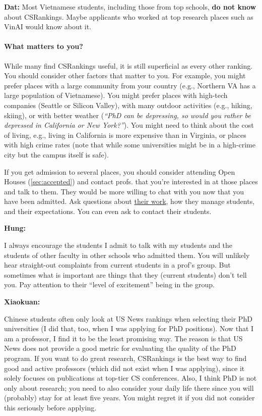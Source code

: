 \documentclass[oneside,11pt,dvipsnames]{book}
\newenvironment{commentbox}[1][]{
  \small
  \begin{mybox}
    {\small \textbf{#1}}
  }{
  \end{mybox}
}
\begin{document}
\begin{commentbox}[Dat:] Most Vietnamese students, including those from top schools, \textbf{do not know} about CSRankings.  Maybe applicants who worked at top research places such as VinAI would know about it.
\end{commentbox}

\paragraph{What matters to you?} While many find CSRankings useful, it is still superficial as every other ranking.  You should consider other factors that matter to you.  For example, you might prefer places with a large community from your country (e.g., Northern VA has a large population of Vietnamese). You might prefer places with high-tech companies (Seattle or Silicon Valley), with many outdoor activities (e.g., hiking, skiing), or with better weather (\emph{``PhD can be depressing, so would you rather be depressed in California or New York?''}).  You might need to think about the cost of living, e.g., living in California is more expensive than in Virginia, or places with high crime rates (note that while some universities might be in a high-crime city but the campus itself is safe).

If you get admission to several places, you should consider attending Open Houses (\autoref{sec:accepted}) and contact profs. that you're interested in at those places and talk to them.  They would be more willing to chat with you now that you have been admitted.  Ask questions about \href{https://github.com/dynaroars/dynaroars.github.io/wiki/Answers-to-Ph.D-Advisor-Guide}{their work}, how they manage students, and their expectations. You can even ask to contact their students.

\begin{commentbox}[Hung:]
  I always encourage the students I admit to talk with my students and the students of other faculty in other schools who admitted them. You will unlikely hear straight-out complaints from current students in a prof's group. But sometimes what is important are things that they (current students) don't tell you. Pay attention to their ``level of excitement'' being in the group.
\end{commentbox}

\begin{commentbox}[Xiaokuan:]
  Chinese students often only look at US News rankings when selecting their PhD universities (I did that, too, when I was applying for PhD positions).
  Now that I am a professor, I find it to be the least promising way.
  The reason is that US News does not provide a good metric for evaluating the quality of the PhD program.
  If you want to do great research, CSRankings is the best way to find good and active professors (which did not exist when I was applying),
  since it solely focuses on publications at top-tier CS conferences.
  Also,
  I think PhD is not only about research;
  you need to also consider your daily life there since you will (probably) stay for at least five years.
  You might regret it if you did not consider this seriously before applying.
\end{commentbox}
\end{document}

